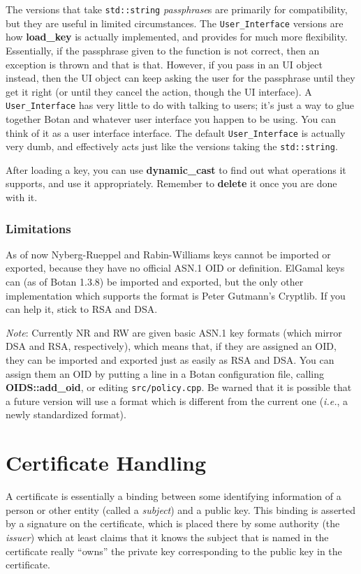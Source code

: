 \documentclass{article}
\newcommand{\filename}[1]{\texttt{#1}}
\newcommand{\function}[1]{\textbf{#1}}
\newcommand{\type}[1]{\texttt{#1}}
\renewcommand{\arg}[1]{\textsl{#1}}
\newcommand{\ie}[0]{\emph{i.e.}}
\begin{document}
The versions that take \type{std::string} \arg{passphrase}s are primarily for
compatibility, but they are useful in limited circumstances. The
\type{User\_Interface} versions are how \function{load\_key} is actually
implemented, and provides for much more flexibility. Essentially, if the
passphrase given to the function is not correct, then an exception is thrown
and that is that. However, if you pass in an UI object instead, then the UI
object can keep asking the user for the passphrase until they get it right (or
until they cancel the action, though the UI interface). A
\type{User\_Interface} has very little to do with talking to users; it's just a
way to glue together Botan and whatever user interface you happen to be
using. You can think of it as a user interface interface. The default
\type{User\_Interface} is actually very dumb, and effectively acts just like
the versions taking the \type{std::string}.

After loading a key, you can use \function{dynamic\_cast} to find out what
operations it supports, and use it appropriately. Remember to \function{delete}
it once you are done with it.

\subsubsection{Limitations}

As of now Nyberg-Rueppel and Rabin-Williams keys cannot be imported or
exported, because they have no official ASN.1 OID or definition. ElGamal keys
can (as of Botan 1.3.8) be imported and exported, but the only other
implementation which supports the format is Peter Gutmann's Cryptlib. If you
can help it, stick to RSA and DSA.

\emph{Note}: Currently NR and RW are given basic ASN.1 key formats (which
mirror DSA and RSA, respectively), which means that, if they are assigned an
OID, they can be imported and exported just as easily as RSA and DSA. You can
assign them an OID by putting a line in a Botan configuration file, calling
\function{OIDS::add\_oid}, or editing \filename{src/policy.cpp}. Be warned that
it is possible that a future version will use a format which is different from
the current one (\ie, a newly standardized format).

\pagebreak
\section{Certificate Handling}

A certificate is essentially a binding between some identifying information of
a person or other entity (called a \emph{subject}) and a public key. This
binding is asserted by a signature on the certificate, which is placed there by
some authority (the \emph{issuer}) which at least claims that it knows the
subject that is named in the certificate really ``owns'' the private key
corresponding to the public key in the certificate.
\end{document}
